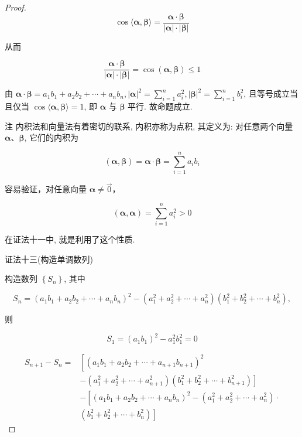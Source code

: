 \begin{proof}
	$$
	\cos \langle\boldsymbol{\alpha}, \boldsymbol{\beta}\rangle=\frac{\boldsymbol{\alpha} \cdot \boldsymbol{\beta}}{|\boldsymbol{\alpha}| \cdot|\boldsymbol{\beta}|}
	$$
	
	从而
	
	$$
	\frac{\boldsymbol{\alpha} \cdot \boldsymbol{\beta}}{|\boldsymbol{\alpha}| \cdot|\boldsymbol{\beta}|}=\cos (\boldsymbol{\alpha}, \boldsymbol{\beta}) \leqslant 1
	$$
	
	由 $\boldsymbol{\alpha} \cdot \boldsymbol{\beta}=a_{1} b_{1}+a_{2} b_{2}+\cdots+a_{n} b_{n},|\boldsymbol{\alpha}|^{2}=\sum_{i=1}^{n} a_{i}^{2},|\boldsymbol{\beta}|^{2}=\sum_{i=1}^{n} b_{i}^{2}$, 且等号成立当且仅当 $\cos \langle\boldsymbol{\alpha}, \boldsymbol{\beta}\rangle=1$, 即 $\boldsymbol{\alpha}$ 与 $\boldsymbol{\beta}$ 平行. 故命题成立.
	
	注 内积法和向量法有着密切的联系, 内积亦称为点积, 其定义为: 对任意两个向量 $\boldsymbol{\alpha} 、 \boldsymbol{\beta}$, 它们的内积为
	
	$$
	(\boldsymbol{\alpha}, \boldsymbol{\beta})=\boldsymbol{\alpha} \cdot \boldsymbol{\beta}=\sum_{i=1}^{n} a_{i} b_{i}
	$$
	
	容易验证，对任意向量 $\boldsymbol{\alpha} \neq \overrightarrow{0} ，$
	
	$$
	(\boldsymbol{\alpha}, \boldsymbol{\alpha})=\sum_{i=1}^{n} a_{i}^{2}>0
	$$
	
	在证法十一中, 就是利用了这个性质.
	
	证法十三(构造单调数列)
	
	构造数列 $\left\{S_{n}\right\}$, 其中
	
	$$
	S_{n}=\left(a_{1} b_{1}+a_{2} b_{2}+\cdots+a_{n} b_{n}\right)^{2}-\left(a_{1}^{2}+a_{2}^{2}+\cdots+a_{n}^{2}\right)\left(b_{1}^{2}+b_{2}^{2}+\cdots+b_{n}^{2}\right),
	$$
	
	则
	
	$$
	S_{1}=\left(a_{1} b_{1}\right)^{2}-a_{1}^{2} b_{1}^{2}=0
	$$
	
	$$
	\begin{aligned}
	S_{n+1}-S_{n}= & {\left[\left(a_{1} b_{1}+a_{2} b_{2}+\cdots+a_{n+1} b_{n+1}\right)^{2}\right.} \\
	& \left.-\left(a_{1}^{2}+a_{2}^{2}+\cdots+a_{n+1}^{2}\right)\left(b_{1}^{2}+b_{2}^{2}+\cdots+b_{n+1}^{2}\right)\right] \\
	& -\left[\left(a_{1} b_{1}+a_{2} b_{2}+\cdots+a_{n} b_{n}\right)^{2}-\left(a_{1}^{2}+a_{2}^{2}+\cdots+a_{n}^{2}\right) \cdot\right. \\
	& \left.\left(b_{1}^{2}+b_{2}^{2}+\cdots+b_{n}^{2}\right)\right]
	\end{aligned}
	$$
	

\end{proof}
